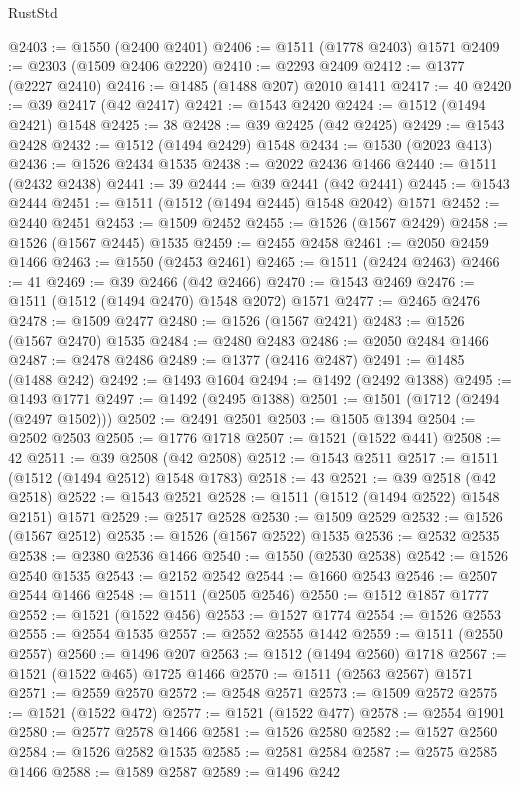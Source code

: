 \begin{lexlean}{RustStd}
\begin{coremodule}
{\begin{coremodule}
{{{{{{{{{{{{{{{{{{{{{{{{{{{{{{{{{{{@2403 := @1550 (@2400 @2401)
@2406 := @1511 (@1778 @2403) @1571
@2409 := @2303 (@1509 @2406 @2220)
@2410 := @2293 @2409
@2412 := @1377 (@2227 @2410)
@2416 := @1485 (@1488 @207) @2010 @1411
@2417 := 40
@2420 := @39 @2417 (@42 @2417)
@2421 := @1543 @2420
@2424 := @1512 (@1494 @2421) @1548
@2425 := 38
@2428 := @39 @2425 (@42 @2425)
@2429 := @1543 @2428
@2432 := @1512 (@1494 @2429) @1548
@2434 := @1530 (@2023 @413)
@2436 := @1526 @2434 @1535
@2438 := @2022 @2436 @1466
@2440 := @1511 (@2432 @2438)
@2441 := 39
@2444 := @39 @2441 (@42 @2441)
@2445 := @1543 @2444
@2451 := @1511 (@1512 (@1494 @2445) @1548 @2042) @1571
@2452 := @2440 @2451
@2453 := @1509 @2452
@2455 := @1526 (@1567 @2429)
@2458 := @1526 (@1567 @2445) @1535
@2459 := @2455 @2458
@2461 := @2050 @2459 @1466
@2463 := @1550 (@2453 @2461)
@2465 := @1511 (@2424 @2463)
@2466 := 41
@2469 := @39 @2466 (@42 @2466)
@2470 := @1543 @2469
@2476 := @1511 (@1512 (@1494 @2470) @1548 @2072) @1571
@2477 := @2465 @2476
@2478 := @1509 @2477
@2480 := @1526 (@1567 @2421)
@2483 := @1526 (@1567 @2470) @1535
@2484 := @2480 @2483
@2486 := @2050 @2484 @1466
@2487 := @2478 @2486
@2489 := @1377 (@2416 @2487)
@2491 := @1485 (@1488 @242)
@2492 := @1493 @1604
@2494 := @1492 (@2492 @1388)
@2495 := @1493 @1771
@2497 := @1492 (@2495 @1388)
@2501 := @1501 (@1712 (@2494 (@2497 @1502)))
@2502 := @2491 @2501
@2503 := @1505 @1394
@2504 := @2502 @2503
@2505 := @1776 @1718
@2507 := @1521 (@1522 @441)
@2508 := 42
@2511 := @39 @2508 (@42 @2508)
@2512 := @1543 @2511
@2517 := @1511 (@1512 (@1494 @2512) @1548 @1783)
@2518 := 43
@2521 := @39 @2518 (@42 @2518)
@2522 := @1543 @2521
@2528 := @1511 (@1512 (@1494 @2522) @1548 @2151) @1571
@2529 := @2517 @2528
@2530 := @1509 @2529
@2532 := @1526 (@1567 @2512)
@2535 := @1526 (@1567 @2522) @1535
@2536 := @2532 @2535
@2538 := @2380 @2536 @1466
@2540 := @1550 (@2530 @2538)
@2542 := @1526 @2540 @1535
@2543 := @2152 @2542
@2544 := @1660 @2543
@2546 := @2507 @2544 @1466
@2548 := @1511 (@2505 @2546)
@2550 := @1512 @1857 @1777
@2552 := @1521 (@1522 @456)
@2553 := @1527 @1774
@2554 := @1526 @2553
@2555 := @2554 @1535
@2557 := @2552 @2555 @1442
@2559 := @1511 (@2550 @2557)
@2560 := @1496 @207
@2563 := @1512 (@1494 @2560) @1718
@2567 := @1521 (@1522 @465) @1725 @1466
@2570 := @1511 (@2563 @2567) @1571
@2571 := @2559 @2570
@2572 := @2548 @2571
@2573 := @1509 @2572
@2575 := @1521 (@1522 @472)
@2577 := @1521 (@1522 @477)
@2578 := @2554 @1901
@2580 := @2577 @2578 @1466
@2581 := @1526 @2580
@2582 := @1527 @2560
@2584 := @1526 @2582 @1535
@2585 := @2581 @2584
@2587 := @2575 @2585 @1466
@2588 := @1589 @2587
@2589 := @1496 @242
}}}}}}}}}}}}}}}}}}}}}}}}}}}}}}}}}}}
\end{coremodule}}
\end{coremodule}
\end{lexlean}
